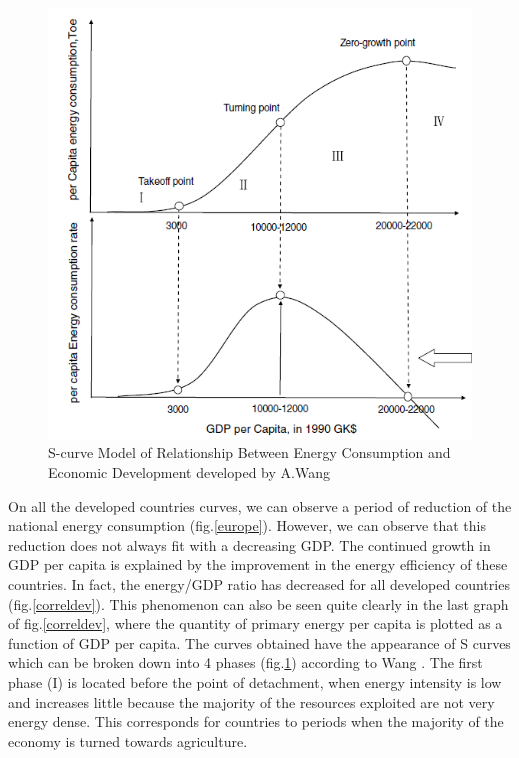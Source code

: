 \documentclass[conference]{IEEEtran}
\begin{document}
\begin{figure}
    \centering
    \includegraphics[scale=0.7]{wang.PNG}
    \caption{S-curve Model of Relationship Between Energy
Consumption and Economic Development developed by A.Wang \cite{wang_s-curve_2014}}
    \label{wang}
\end{figure}
On all the developed countries curves, we can observe a period of reduction of the national energy consumption (fig.\ref{europe}). However, we can observe that this reduction does not always fit with a decreasing GDP. The continued growth in GDP per capita is explained by the improvement in the energy efficiency of these countries. In fact, the energy/GDP ratio has decreased for all developed countries (fig.\ref{correldev}). 
This phenomenon can also be seen quite clearly in the last graph of fig.\ref{correldev}, where the quantity of primary energy per capita is plotted as a function of GDP per capita. The curves obtained have the appearance of S curves which can be broken down into 4 phases (fig.\ref{wang}) according to Wang \cite{wang_s-curve_2014}. The first phase (I) is located before the point of detachment, when energy intensity is low and increases little because the majority of the resources exploited are not very energy dense. This corresponds for countries to periods when the majority of the economy is turned towards agriculture. 
\end{document}
